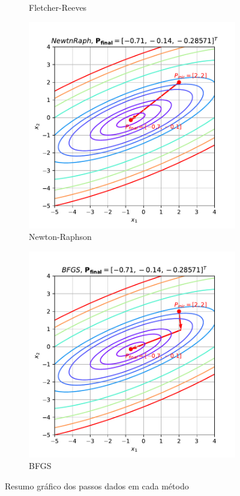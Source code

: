 \documentclass[10pt, a4paper]{article}
\begin{document}
\begin{figure}[htpb]
\begin{subfigure}[b]{0.32\textwidth}
    \caption{Fletcher-Reeves}
    \label{fig:q1_fletchrvs}
  \end{subfigure}
  \hfill
  \begin{subfigure}[b]{0.32\textwidth}
    \centering
    \includegraphics[width=\textwidth]{images/q1_NewtnRaph.pdf}
    \caption{Newton-Raphson}
    \label{fig:q1_newtnraph}
  \end{subfigure}
  \hfill
  \begin{subfigure}[b]{0.32\textwidth}
    \centering
    \includegraphics[width=\textwidth]{images/q1_BFGS.pdf}
    \caption{BFGS}
    \label{fig:q1_bfgs}
  \end{subfigure}
     \caption{Resumo gráfico dos passos dados em cada método}
     \label{fig:q1}
\end{figure}




\end{document}

